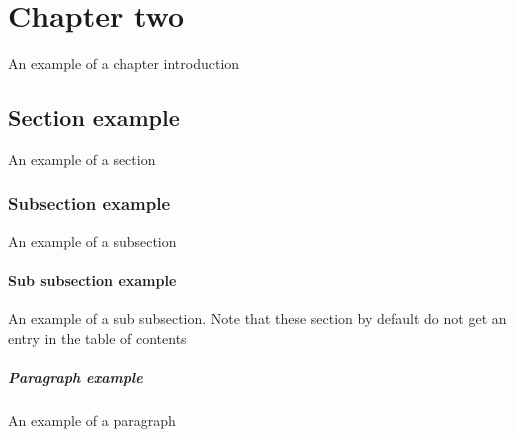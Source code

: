 \chapter{Chapter two}
An example of a chapter introduction

\section{Section example}
An example of a section

\subsection{Subsection example}
An example of a subsection

\subsubsection{Sub subsection example}
An example of a sub subsection. Note that these section by default do not get an entry in the table of contents

\paragraph{Paragraph example}
An example of a paragraph